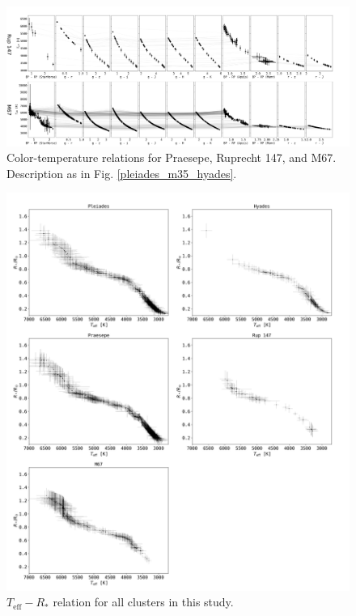 \documentclass{aa}
\begin{document}
   \begin{figure}
		\centering
           \includegraphics[angle=90, width=0.56\hsize]{pics/clusters/Teff_spread_old.png}

      \caption{Color-temperature relations for Praesepe, Ruprecht 147, and M67. Description as in Fig. \ref{pleiades_m35_hyades}.}
         \label{praesepe_ngc6774_ngc2682}
   \end{figure}   



   \begin{figure}
		\centering
           \includegraphics[width=\hsize]{pics/clusters/teff_R.png}

      \caption{$T_\mathrm{eff}-R_*$ relation for all clusters in this study.}
         \label{teff_R}
   \end{figure}   
\end{document}
